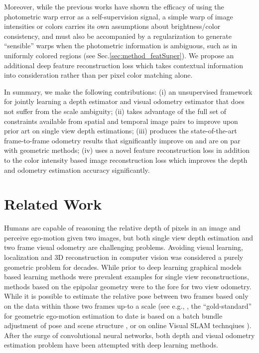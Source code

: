 \documentclass[10pt,twocolumn,letterpaper]{article}
\begin{document}
Moreover, while the previous works have shown the efficacy of using the photometric warp error as a self-supervision signal, a simple warp of image intensities or colors carries its own assumptions about brightness/color consistency, and must also be accompanied by a regularization to generate ``sensible'' warps when the photometric information is ambiguous, such as in uniformly colored regions (see Sec.\ref{sec:method_featSuper}). We propose an additional deep feature reconstruction loss which takes contextual information into consideration rather than per pixel color matching alone. 

In summary, we make the following contributions: 
(i) an unsupervised framework for jointly learning a depth estimator and visual odometry estimator that does not suffer from the scale ambiguity; 
(ii) takes advantage of the full set of constraints available from spatial and temporal image pairs to improve upon prior art on single view depth estimations; 
(iii) produces the state-of-the-art frame-to-frame odometry results that significantly improve on \cite{zhou2017sfmlearner} and are on par with geometric methods; 
(iv) uses a novel feature reconstruction loss in addition to the color intensity based image reconstruction loss which improves the depth and odometry estimation accuracy significantly.

\section{Related Work} \label{sec:relWork} 


Humans are capable of reasoning the relative depth of pixels in an image and perceive ego-motion given two images, but both single view depth estimation and two frame visual odometry are challenging problems. Avoiding visual learning, localization and 3D reconstruction in computer vision was considered a purely geometric problem for decades. 
While prior to deep learning graphical models based learning methods \cite{saxena2006depth}\cite{saxena2009make3d} were prevalent examples for single view reconstructions, methods based on the epipolar geometry were to the fore for two view odometry. While it is possible to estimate the relative pose between two frames based only on the data within those two frames up-to a scale (see e.g., \cite{LonguetHiggins81}, the ``gold-standard'' for geometric ego-motion estimation to date is based on a batch bundle adjustment of pose and scene structure \cite{triggs1999bundle}, or on online Visual SLAM technqiues \cite{davison2007monoslam}). After the surge of convolutional neural networks, both depth and visual odometry estimation problem have been attempted with deep learning methods. 
\end{document}
